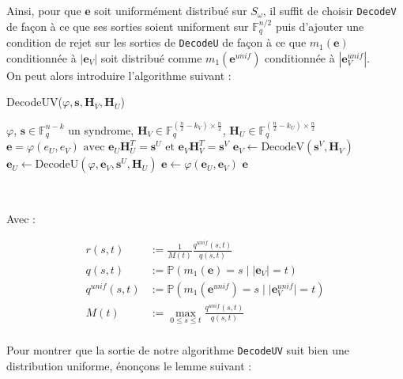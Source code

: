 \documentclass[12pt]{article}
\theoremstyle{plain}
\theoremstyle{definition}
\newcommand{\F}{\mathbb{F}}
\newcommand{\e}{\mathbf{e}}
\newcommand{\s}{\mathbf{s}}
\begin{document}
\noindent Ainsi, pour que $\mathbf{e}$ soit uniformément distribué sur $S_\omega$, il suffit de choisir \verb|DecodeV| de façon à ce que ses sorties soient uniforment sur $\F_q^{n/2}$ puis d'ajouter une condition de rejet sur les sorties de \verb|DecodeU| de façon à ce que $m_1(\mathbf{e})$ conditionnée à $|\mathbf{e}_V|$ soit distribué comme $m_1(\mathbf{e}^{unif})$ conditionnée à $|\mathbf{e}_V^{unif}|$. \\
On peut alors introduire l'algorithme suivant :
\begin{algorithm}
	\caption{DecodeUV($\varphi, \s, \mathbf{H}_V, \mathbf{H}_U$)}
	\begin{algorithmic}[1]
   	 	\REQUIRE $\varphi$, $\s \in \F_q^{n-k}$ un syndrome, $\mathbf{H}_V \in \F_q^{(\frac{n}{2} - k_V) \times \frac{n}{2}}$, $\mathbf{H}_U \in \F_q^{(\frac{n}{2} - k_U) \times \frac{n}{2}}$
   	 	\ENSURE $\e = \varphi(e_U, e_V) \text{ avec } \e_U\mathbf{H}_U^T = \s^U \text{ et } \e_V\mathbf{H}_V^T = \s^V$
    	\STATE $\e_V \leftarrow \text {DecodeV}(\s^V,\mathbf{H}_V)$
    	\REPEAT 
    	\STATE $\e_U \leftarrow \text {DecodeU}(\varphi, \e_V, \s^U, \mathbf{H}_U)$
    	\STATE $\e \leftarrow \varphi(\e_U,\e_V)$
    	\UNTIL {$\text{rand}([0,1]) > \mathbf{r}_U(m_1(\e),|\e_V|)$}
    	\RETURN $\e$
    \end{algorithmic}
\end{algorithm}\


\noindent Avec :

\begin{equation*}
   \begin{split}
    r(s,t) &:= \frac{1}{M(t)}\frac{q^{unif}(s,t)}{q(s,t)}\\[.6cm]
    q(s,t) &:= \mathbb{P}(m_1(\mathbf{e})=s\;|\;|\mathbf{e}_V|=t)\\[.6cm]
    q^{unif}(s,t) &:= \mathbb{P}(m_1(\mathbf{e}^{unif})=s\;|\;|\mathbf{e}^{unif}_V|=t)\\[.6cm]
    M(t) &:= \max_{0 \leq s \leq t} \frac{q^{unif}(s,t)}{q(s,t)}\\[.6cm]
    \end{split}
\end{equation*}



Pour montrer que la sortie de notre algorithme \verb|DecodeUV| suit bien une distribution uniforme, énonçons le lemme suivant :
\end{document}
